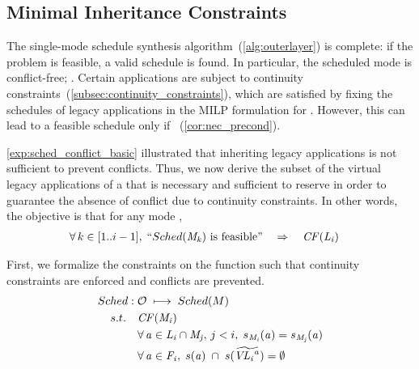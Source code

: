 \subsection{Minimal Inheritance Constraints}
\label{subsec:min_constraints}

The single-mode schedule synthesis algorithm~(\cref{alg:outerlayer}) is complete: if the problem is feasible, a valid schedule is found. In particular, the scheduled mode is conflict-free; \ie \cf{\modei}.
Certain applications are subject to continuity constraints~(\cref{subsec:continuity_constraints}), which are satisfied by fixing the schedules of legacy applications \legAppi in the MILP formulation for \modei.
However, this can lead to a feasible schedule only if \cf{\legAppi}~(\cref{cor:nec_precond}).

\cref{exp:sched_conflict_basic} illustrated that inheriting legacy applications is not sufficient to prevent conflicts.
Thus, we now derive the subset of the virtual legacy applications \virtlegAppi of a \modei that is necessary and sufficient to reserve in order to guarantee the absence of conflict due to continuity constraints.
In other words, the objective is that for any mode \modei,
\begin{align}\label{eq:obj_conflict-free}
&\forall \, k \in [1..i-1], \; \text{``\sched{\mode{k}} is feasible''} \quad \Rightarrow \quad \cf{\legApp{i}}
\end{align}


First, we formalize the constraints on the \sched{} function such that continuity constraints are enforced and conflicts are prevented.
\begin{align}
\label{eq:sched_redef}
Sched: \; &\mathcal{O} \; \longmapsto \; Sched(M)\\
\nonumber
s.t. \quad
		& \mathit{CF({\mathit{M_{i}}})}\\
\nonumber
		& \forall\, \mathit{a_{}} \in \mathit{L_{i}} \cap \mathit{M_{j}}, \, j < i, \;	s_\mathit{M_{i}}(\mathit{a_{}}) = s_\mathit{M_{j}}(\mathit{a_{}})\\
\nonumber
		& \forall\, \mathit{a_{}} \in \mathit{F_{i}}, \; s(\mathit{a_{}}) \; \cap \; s(\widetilde{\mathit{VL_{i}}^{\mathit{a_{}}}}) = \emptyset
\end{align}

